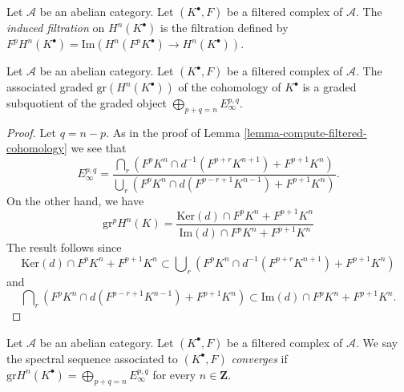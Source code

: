 \begin{definition}
\label{definition-filtration-cohomology-filtered-complex}
Let $\mathcal{A}$ be an abelian category.
Let $(K^\bullet, F)$ be a filtered complex of $\mathcal{A}$.
The {\it induced filtration} on $H^n(K^\bullet)$ is the filtration defined
by $F^pH^n(K^\bullet) = \text{Im}(H^n(F^pK^\bullet) \to H^n(K^\bullet))$.
\end{definition}

\begin{lemma}
\label{lemma-compute-cohomology-filtered-complex}
Let $\mathcal{A}$ be an abelian category.
Let $(K^\bullet, F)$ be a filtered complex of $\mathcal{A}$.
The associated graded $\text{gr}(H^n(K^\bullet))$ of the cohomology of
$K^\bullet$ is a graded subquotient of the graded object
$\bigoplus_{p + q = n} E_\infty^{p, q}$.
\end{lemma}

\begin{proof}
Let $q = n - p$. As in the proof of
Lemma \ref{lemma-compute-filtered-cohomology} we see that
$$
E_\infty^{p, q} =
\frac{\bigcap_r (F^pK^{n} \cap d^{-1}(F^{p + r}K^{n + 1})
+ F^{p + 1}K^{n})}
{\bigcup_r (F^pK^{n} \cap d(F^{p - r + 1}K^{n - 1})
+ F^{p + 1}K^{n})}.
$$
On the other hand, we have
\begin{equation}
\label{equation-filtration-cohomology}
\text{gr}^p H^{n}(K) =
\frac{\text{Ker}(d) \cap F^pK^{n} + F^{p + 1}K^{n}}
{\text{Im}(d) \cap F^pK^{n} + F^{p + 1}K^{n}}
\end{equation}
The result follows since
\begin{equation}
\label{equation-on-top-bigraded}
\text{Ker}(d) \cap F^pK^{n} + F^{p + 1}K^{n}
\subset
\bigcup\nolimits_r
\left(
F^pK^{n} \cap d^{-1}(F^{p + r}K^{n + 1}) + F^{p + 1}K^{n}
\right)
\end{equation}
and
\begin{equation}
\label{equation-at-bottom-bigraded}
\bigcap\nolimits_r
\left(
F^pK^{n} \cap d(F^{p - r + 1}K^{n - 1}) + F^{p + 1}K^{n}
\right)
\subset
\text{Im}(d) \cap F^pK^{n} + F^{p + 1}K^{n}.
\end{equation}
\end{proof}

\begin{definition}
\label{definition-filtered-complex-ss-converges}
Let $\mathcal{A}$ be an abelian category.
Let $(K^\bullet, F)$ be a filtered complex of $\mathcal{A}$.
We say the spectral sequence associated to $(K^\bullet, F)$
{\it converges} if
$\text{gr} H^n(K^\bullet) = \bigoplus_{p + q = n} E_{\infty}^{p, q}$
for every $n \in \mathbf{Z}$.
\end{definition}


